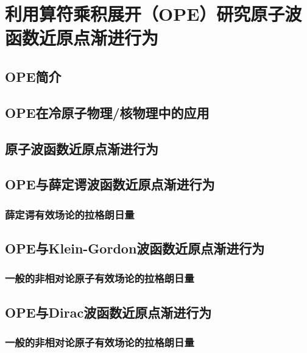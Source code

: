 \chapter{利用算符乘积展开（OPE）研究原子波函数近原点渐进行为\label{chap_OPE}}


\section{OPE简介}

\section{OPE在冷原子物理/核物理中的应用}


\section{原子波函数近原点渐进行为}

\section{OPE与薛定谔波函数近原点渐进行为}
\subsection{薛定谔有效场论的拉格朗日量}

\section{OPE与Klein-Gordon波函数近原点渐进行为}
\subsection{一般的非相对论原子有效场论的拉格朗日量}

\section{OPE与Dirac波函数近原点渐进行为}
\subsection{一般的非相对论原子有效场论的拉格朗日量}